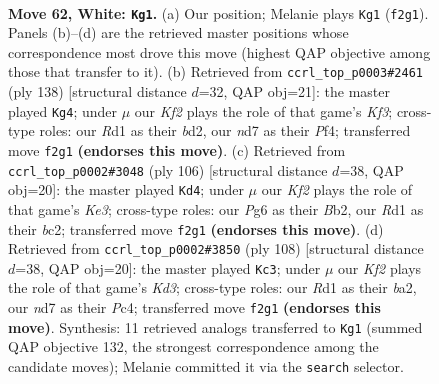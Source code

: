 \documentclass[11pt]{article}
\begin{document}
\clearpage

\begin{figure}[p]\centering
\begin{subfigure}{0.46\textwidth}\centering
\resizebox{\linewidth}{!}{%
\newchessgame
\chessboard[
  setfen={6k1/3nr3/6P1/8/p1p5/P1P4p/1BP2K1P/3R4 w - - 13 62},
  showmover=false,
  pgfstyle=straightmove, color=movearrow, markmove={f2-g1}
]}
\caption{}
\end{subfigure}\hfill
\begin{subfigure}{0.46\textwidth}\centering
\resizebox{\linewidth}{!}{%
\newchessgame
\chessboard[
  setfen={8/5k2/3p3p/2pP1P2/2B2P2/1P3K1P/3b4/8 w - - 17 70},
  showmover=false,
  pgfstyle=straightmove, color=movearrow, markmove={f3-g4}
]}
\caption{}
\end{subfigure}
\\[4pt]
\begin{subfigure}{0.46\textwidth}\centering
\resizebox{\linewidth}{!}{%
\newchessgame
\chessboard[
  setfen={8/8/p1ppk1p1/P7/1P2P2P/4K3/1Bb4P/8 w - - 29 54},
  showmover=false,
  pgfstyle=straightmove, color=movearrow, markmove={e3-d4}
]}
\caption{}
\end{subfigure}\hfill
\begin{subfigure}{0.46\textwidth}\centering
\resizebox{\linewidth}{!}{%
\newchessgame
\chessboard[
  setfen={8/5p1p/kp3B2/2p5/p1P3P1/P2K2P1/bP6/8 w - - 12 55},
  showmover=false,
  pgfstyle=straightmove, color=movearrow, markmove={d3-c3}
]}
\caption{}
\end{subfigure}
\caption{\textbf{Move 62, White: \texttt{Kg1}.} (a) Our position; Melanie plays \texttt{Kg1} (\texttt{f2g1}). Panels (b)--(d) are the retrieved master positions whose correspondence most drove this move (highest QAP objective among those that transfer to it). (b) Retrieved from \texttt{ccrl\_top\_p0003\#2461} (ply 138) [structural distance $d$=32, QAP obj=21]: the master played \texttt{Kg4}; under $\mu$ our \emph{Kf2} plays the role of that game's \emph{Kf3}; cross-type roles: our \emph{R}d1 as their \emph{b}d2, our \emph{n}d7 as their \emph{P}f4; transferred move \texttt{f2g1} \textbf{(endorses this move)}. (c) Retrieved from \texttt{ccrl\_top\_p0002\#3048} (ply 106) [structural distance $d$=38, QAP obj=20]: the master played \texttt{Kd4}; under $\mu$ our \emph{Kf2} plays the role of that game's \emph{Ke3}; cross-type roles: our \emph{P}g6 as their \emph{B}b2, our \emph{R}d1 as their \emph{b}c2; transferred move \texttt{f2g1} \textbf{(endorses this move)}. (d) Retrieved from \texttt{ccrl\_top\_p0002\#3850} (ply 108) [structural distance $d$=38, QAP obj=20]: the master played \texttt{Kc3}; under $\mu$ our \emph{Kf2} plays the role of that game's \emph{Kd3}; cross-type roles: our \emph{R}d1 as their \emph{b}a2, our \emph{n}d7 as their \emph{P}c4; transferred move \texttt{f2g1} \textbf{(endorses this move)}. Synthesis: 11 retrieved analogs transferred to \texttt{Kg1} (summed QAP objective 132, the strongest correspondence among the candidate moves); Melanie committed it via the \texttt{search} selector.}
\label{fig:thought-m122}
\end{figure}
\end{document}
